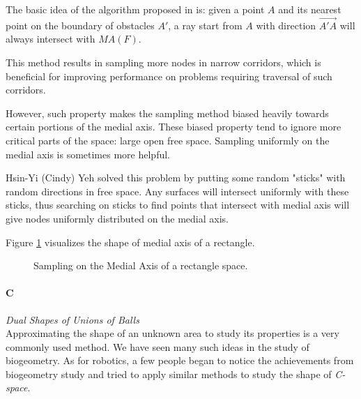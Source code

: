 \documentclass[11pt]{article}
\begin{document}
\indent The basic idea of the algorithm proposed in \cite{MAPRM} is: given a point $A$ and its nearest point on the boundary of obstacles $A'$, a ray start from $A$ with direction $\overrightarrow{A'A}$ will always intersect with $MA(F)$.

\indent This method results in sampling more nodes in narrow corridors, which is beneficial for improving performance on problems requiring traversal of such corridors.

\indent However, such property makes the sampling method biased heavily towards certain portions of the medial axis. These biased property tend to ignore more critical parts of the space: large open free space. Sampling uniformly on the medial axis is sometimes more helpful.

\indent Hsin-Yi (Cindy) Yeh \cite{UMAPRM} solved this problem by putting some random "sticks" with random directions in free space. Any surfaces will intersect uniformly with these sticks, thus searching on sticks to find points that intersect with medial axis will give nodes uniformly distributed on the medial axis.

\indent Figure \ref{fig:Medial Axis} visualizes the shape of medial axis of a rectangle.

\begin{figure}
	\caption{\label{fig:Medial Axis} Sampling on the Medial Axis of a rectangle space.\cite{Book}}
\end{figure}


\paragraph{C} \emph{Dual Shapes of Unions of Balls} \hfill\\
\indent Approximating the shape of an unknown area to study its properties is a very commonly used method. We have seen many such ideas in the study of biogeometry. As for robotics, a few people began to notice the achievements from biogeometry study and tried to apply similar methods to study the shape of \emph{C-space}. 
\end{document}
